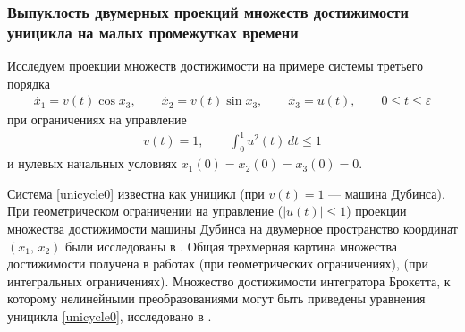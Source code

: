 \documentclass[../main.tex]{subfiles}
\begin{document}
\subsubsection{Выпуклость двумерных проекций множеств достижимости уницикла на малых промежутках времени} 
 Исследуем проекции множеств достижимости на примере системы третьего порядка
 \begin{gather}\label{unicycle0}
 \dot{x_1} = v(t)\cos x_3, \qquad
 \dot{x_2} = v(t)\sin x_3, \qquad
 \dot{x_3} = u(t), \qquad 0 \leqslant t \leqslant \varepsilon
 \end{gather}
 при ограничениях на управление 
 \begin{gather*}
 v(t) = 1, \qquad \int_0^1 u^2(t) \, dt \leqslant 1
 \end{gather*}
 и нулевых начальных условиях $ x_1(0) = x_2(0) = x_3(0) = 0 $.
 
 Система \eqref{unicycle0} известна как уницикл (при $ v(t) = 1$ --- машина Дубинса). 
При геометрическом
 ограничении на
 управление ($|u(t)|\leqslant 1$) проекции множества достижимости машины Дубинса на двумерное пространство координат $(x_1,\,x_2)$ были исследованы в
 \cite{Cockayne}. 
Общая трехмерная картина множества достижимости получена в
 работах \cite{Patsko} (при геометрических ограничениях), \cite{Patsko2023} (при интегральных ограничениях). 
Множество достижимости интегратора Брокетта, к которому нелинейными преобразованиями могут быть приведены уравнения уницикла \eqref{unicycle0}, исследовано в \cite{Vdovin}.
 
\end{document}
